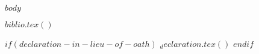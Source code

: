 
    \newpage

    $body$
    

    \clearpage

$biblio.tex()$

$if(declaration-in-lieu-of-oath)$
$_declaration.tex()$
$endif$



